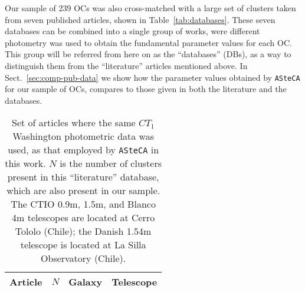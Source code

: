 \documentclass{aa}
\begin{document}
Our sample of 239 OCs was also cross-matched with a large set of clusters taken
from seven published articles, shown in Table~\ref{tab:databases}.
These seven databases can be combined into a single group of works, were
different photometry was used to obtain the fundamental parameter values for
each OC.\@
This group will be referred from here on as the ``databases'' (DBs), as a way to
distinguish them from the ``literature'' articles mentioned above.
%
In Sect.~\ref{sec:comp-pub-data} we show how the parameter values obtained
by \texttt{ASteCA} for our sample of OCs, compares to those given in both the
literature and the databases.

\begin{table} 
\centering
 \caption{Set of articles where the same $CT_1$ Washington photometric data was
 used, as that employed by \texttt{ASteCA} in this work.
 $N$ is the number of clusters present in this ``literature'' database, which
 are also present in our sample. The CTIO 0.9m, 1.5m, and Blanco 4m
 telescopes are  located at Cerro Tololo (Chile); the Danish 1.54m telescope is
 located at La Silla Observatory (Chile).}
\label{tab:literature}
 \begin{tabular}{l c c c}
\hline\hline
Article & $N$ & Galaxy & Telescope \\
\hline

\end{tabular}
\end{table}
\end{document}
